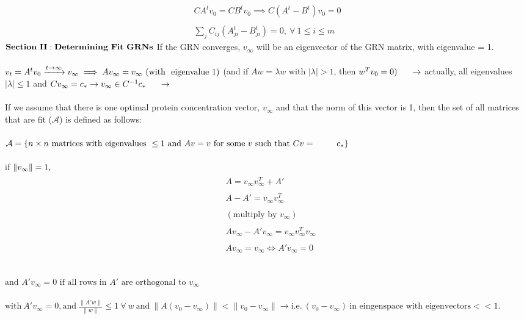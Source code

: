 \documentclass[a4paper,12pt]{article}
\begin{document}
\\ \\ \begin{equation} \begin{split}
CA^{t}v_{0} = CB^{t}v_{0} \implies C(A^{t} - B^{t})v_{0} = 0 \\  \\
\sum_{j}C_{ij}(A^{t}_{ji} - B^{t}_{ji}) = 0, \ \forall \ 1 \leq i \leq m
\end{split} \end{equation}
$ \\ \\
\bold{Section\ II: Determining\ Fit\ GRNs }$
If the GRN converges, $v_{\infty}$ will be an eigenvector of the GRN matrix, with eigenvalue = 1. 
 \\ \\
$
v_{t} = A^{t}v_{0} \xrightarrow{t \rightarrow \infty} v_{\infty}
\implies Av_{\infty} = v_{\infty}  \ (\mbox{with \ eigenvalue} \ 1) \\ \\
$
(and if $Aw = \lambda w$ with $| \lambda | > 1$, then $w^{T}v_{0} = 0
) \\ \\ \indent \rightarrow$ actually, all eigenvalues $| \lambda | \leq 1$
and
$
Cv_{\infty} = c_{*} \rightarrow v_{\infty} \in C^{-1}c_{*}\\ \\ \indent \rightarrow$ \\ \\
If we assume that there is one optimal protein concentration vector, $v_{\infty}$ and that the norm of this vector is 1, then the set of all matrices that are fit ($\mathcal{A}$) is defined as follows:\\ \\
$\mathcal{A} = \{ n \times n \ \mbox{matrices with eigenvalues} \ \leq 1 \ \mbox{and} \ Av=v \ \mbox{for some}\ v \ \mbox{such that} \ Cv= \indent \ \ \ c_{*} \}
$
\\  \\ if $
\lVert v_{\infty} \rVert = 1, \\ $
\begin{align} \begin{split}
&A = v_{\infty}v_{\infty}^{T} + A' \\ \\ 
&A - A' =  v_{\infty}v_{\infty}^{T} \\ \\
&(\mbox{multiply by } v_{\infty}) \\ \\
&A v_{\infty} - A' v_{\infty} = v_{\infty}v_{\infty}^{T} v_{\infty} \\ \\
&A v_{\infty} = v_{\infty} \iff A' v_{\infty} = 0 \\ \\
\end{split} \end{align} \\
$\mbox{and } A' v_{\infty} = 0 \mbox{ if all rows in } A' \mbox{ are orthogonal to } v_{\infty}$ \\ \\

$\mbox{with} \ A' v_{\infty} = 0,  \mbox{and} \ \frac{\lVert A'w \rVert}{\lVert w \rVert} \leq 1\ \forall \ w \ \mbox{and}\ \lVert A(v_{0} - v_{\infty}) \rVert < \lVert v_{0} - v_{\infty} \rVert \rightarrow \mbox{i.e.} \ (v_{0} - v_{\infty}) \ \mbox{in eingenspace with eigenvectors} << 1.
$
\end{document}
